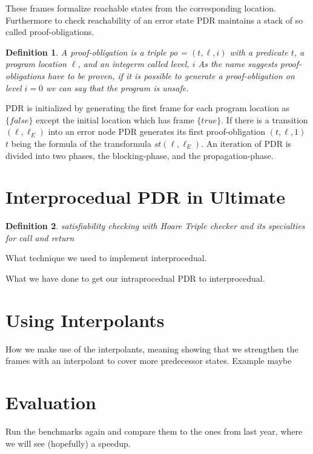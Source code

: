 \documentclass{article}
\newtheorem{mydef}{Definition}
\newcommand\mycom[1]{}
\newcommand\mycom[1]{#1}
\newcommand{\meta}[1]{\mycom{\todo[color=blue!10,inline,caption={Beschreibung},nolist]{\setlist{nolistsep}\small #1}}}
\begin{document}
	These frames formalize reachable states from the corresponding location.
	Furthermore to check reachability of an error state PDR maintains a stack of so called proof-obligations.
	\begin{mydef}
		A proof-obligation is a triple po = $(t, \ell, i)$ with a predicate $t$, a program location $\ell$, and an integerm called level, $i$
		As the name suggests proof-obligations have to be proven, if it is possible to generate a proof-obligation on level $i = 0$ we can say that the program is unsafe.
	\end{mydef}
	PDR is initialized by generating the first frame for each program location as $\{ false \}$ except the initial location which has frame $\{ true \}$. If there is a transition $(\ell, \ell_E)$ into an error node PDR generates its first proof-obligation $(t, \ell, 1)$ $t$ being the formula of the transformula $st(\ell, \ell_E)$.
	An iteration of PDR is divided into two phases, the blocking-phase, and the propagation-phase.
	
	\section{Interprocedual PDR in Ultimate}
	
		
	\begin{mydef}
		satisfiability checking with Hoare Triple checker and its specialties for call and return
	\end{mydef}
	
	What technique we used to implement interprocedual. 
    \meta{(@ \textbf{Discussion of why we do it our way and showing why the other approaches do not work})}
    What we have done to get our intraprocedual PDR to interprocedual.
	
	\section{Using Interpolants}
	How we make use of the interpolants, meaning showing that we strengthen the frames with an interpolant to cover more predecessor states. Example maybe
	
	\section{Evaluation}
	Run the benchmarks again and compare them to the ones from last year, where we will see (hopefully) a speedup.
	
	\pagebreak
	



	
\end{document}
